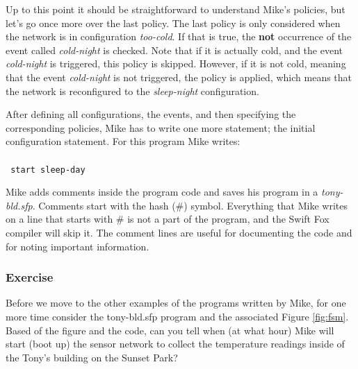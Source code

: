\documentclass[11pt]{article}
\begin{document}
Up to this point it should be straightforward to understand Mike's
policies, but let's go once more over the last policy. The last policy is
only considered when the network is in configuration \textit{too-cold}. If 
that is true, the \textbf{not} occurrence of the event called
\textit{cold-night} is checked. Note that if it is actually cold, and the
event \textit{cold-night} is triggered, this policy is skipped. However, if
it is not cold, meaning that the event \textit{cold-night} is not
triggered, the policy is applied, which means that the network is
reconfigured to the \textit{sleep-night} configuration. 

After defining all configurations, the events, and then specifying
the corresponding policies, Mike has to write one more statement; the
initial configuration statement. For this program Mike writes:		\\
\\
\texttt{
start sleep-day								\\
}

Mike adds comments inside the program code and saves his program in 
a \textit{tony-bld.sfp}. Comments start with the hash (\#) symbol. 
Everything that Mike writes on a line that starts with \# is not 
a part of the program, and the Swift Fox compiler will skip it. 
The comment lines are useful for
documenting the code and for noting important information.

\vspace{\fill}

\subsubsection{Exercise}

Before we move to the other examples of the programs written by 
Mike, for one more time consider the tony-bld.sfp program and 
the associated Figure \ref{fig:fsm}. Based of the figure and 
the code, can you tell when (at what hour) Mike will start (boot up)
the sensor network to collect the temperature readings 
inside of the Tony's building on the Sunset Park?
\end{document}
